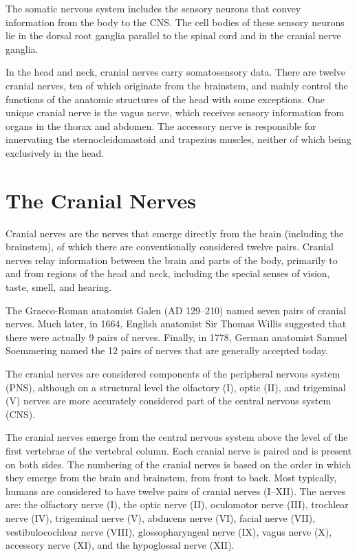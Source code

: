 The somatic nervous system includes the sensory neurons that convey information from the body to the CNS. The cell bodies of these sensory neurons lie in the dorsal root ganglia parallel to the spinal cord and in the cranial nerve ganglia.

In the head and neck, cranial nerves carry somatosensory data. There are twelve cranial nerves, ten of which originate from the brainstem, and mainly control the functions of the anatomic structures of the head with some exceptions. One unique cranial nerve is the vagus nerve, which receives sensory information from organs in the thorax and abdomen. The accessory nerve is responsible for innervating the sternocleidomastoid and trapezius muscles, neither of which being exclusively in the head.

\hypertarget{the-cranial-nerves}{%
\section{The Cranial Nerves}\label{the-cranial-nerves}}

Cranial nerves are the nerves that emerge directly from the brain (including the brainstem), of which there are conventionally considered twelve pairs. Cranial nerves relay information between the brain and parts of the body, primarily to and from regions of the head and neck, including the special senses of vision, taste, smell, and hearing.

The Graeco-Roman anatomist Galen (AD 129--210) named seven pairs of cranial nerves. Much later, in 1664, English anatomist Sir Thomas Willis suggested that there were actually 9 pairs of nerves. Finally, in 1778, German anatomist Samuel Soemmering named the 12 pairs of nerves that are generally accepted today.

The cranial nerves are considered components of the peripheral nervous system (PNS), although on a structural level the olfactory (I), optic (II), and trigeminal (V) nerves are more accurately considered part of the central nervous system (CNS).

The cranial nerves emerge from the central nervous system above the level of the first vertebrae of the vertebral column. Each cranial nerve is paired and is present on both sides. The numbering of the cranial nerves is based on the order in which they emerge from the brain and brainstem, from front to back. Most typically, humans are considered to have twelve pairs of cranial nerves (I--XII). The nerves are: the olfactory nerve (I), the optic nerve (II), oculomotor nerve (III), trochlear nerve (IV), trigeminal nerve (V), abducens nerve (VI), facial nerve (VII), vestibulocochlear nerve (VIII), glossopharyngeal nerve (IX), vagus nerve (X), accessory nerve (XI), and the hypoglossal nerve (XII).

